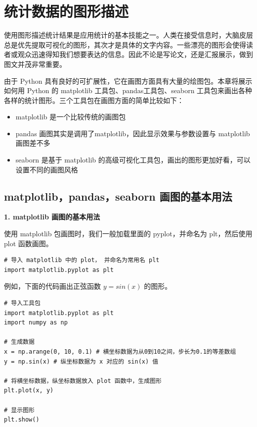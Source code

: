 \chapter{统计数据的图形描述}

使用图形描述统计结果是应用统计的基本技能之一。人类在接受信息时，大脑皮层总是优先提取可视化的图形，其次才是具体的文字内容。一些漂亮的图形会使得读者或观众迅速得知我们想要表达的信息。因此不论是写论文，还是汇报展示，做到图文并茂非常重要。

由于 Python 具有良好的可扩展性，它在画图方面具有大量的绘图包。本章将展示如何用 Python 的 matplotlib 工具包、pandas工具包、seaborn 工具包来画出各种各样的统计图形。三个工具包在画图方面的简单比较如下：

\begin{itemize}
  \item matplotlib 是一个比较传统的画图包
  \item pandas 画图其实是调用了matplotlib，因此显示效果与参数设置与 matplotlib 画图差不多
  \item seaborn 是基于 matplotlib 的高级可视化工具包，画出的图形更加好看，可以设置不同的画图风格
\end{itemize}


\section{matplotlib，pandas，seaborn 画图的基本用法}

\vspace{3pt}
\noindent\textbf{1. matplotlib 画图的基本用法}
\vspace{3pt}

使用 matplotlib 包画图时，我们一般加载里面的 pyplot，并命名为 plt，然后使用 plot 函数画图。


\begin{lstlisting}[Language=Python]
# 导入 matplotlib 中的 plot， 并命名为常用名 plt
import matplotlib.pyplot as plt
\end{lstlisting}

例如，下面的代码画出正弦函数 $y=sin(x)$ 的图形。


\begin{lstlisting}[Language=Python]
# 导入工具包
import matplotlib.pyplot as plt
import numpy as np

# 生成数据
x = np.arange(0, 10, 0.1) # 横坐标数据为从0到10之间，步长为0.1的等差数组
y = np.sin(x) # 纵坐标数据为 x 对应的 sin(x) 值

# 将横坐标数据，纵坐标数据放入 plot 函数中，生成图形
plt.plot(x, y)

# 显示图形
plt.show()

\end{lstlisting}
\sloppy %


